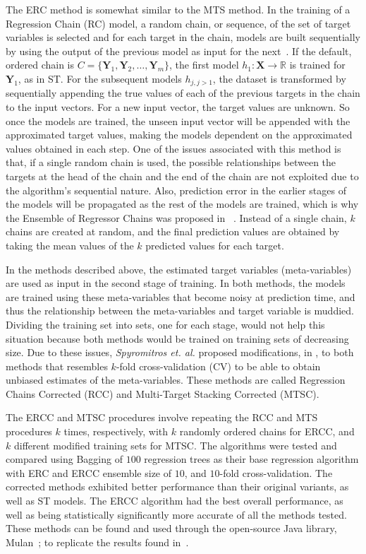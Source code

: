 \documentclass[reqno]{vcuthesis}
\numberwithin{equation}{chapter}
\begin{document}
The ERC method is somewhat similar to the MTS method. In the training of a Regression Chain (RC) model, a random chain, or sequence, of the set of target variables is selected and for each target in the chain, models are built sequentially by using the output of the previous model as input for the next~\cite{Xioufis2016}. If the default, ordered chain is $C = \{\bm Y_1, \bm Y_2, \ldots, \bm Y_m\}$, the first model $h_1 : \bm X \rightarrow \mathbb{R}$ is trained for $\bm Y_1$, as in ST. For the subsequent models $h_{j,j>1}$, the dataset is transformed by sequentially appending the true values of each of the previous targets in the chain to the input vectors. For a new input vector, the target values are unknown. So once the models are trained, the unseen input vector will be appended with the approximated target values, making the models dependent on the approximated values obtained in each step. One of the issues associated with this method is that, if a single random chain is used, the possible relationships between the targets at the head of the chain and the end of the chain are not exploited due to the algorithm's sequential nature. Also, prediction error in the earlier stages of the models will be propagated as the rest of the models are trained, which is why the Ensemble of Regressor Chains was proposed in ~\cite{Spyromitros2014}. Instead of a single chain, $k$ chains are created at random, and the final prediction values are obtained by taking the mean values of the $k$ predicted values for each target. 

In the methods described above, the estimated target variables (meta-variables) are used as input in the second stage of training. In both methods, the models are trained using these meta-variables that become noisy at prediction time, and thus the relationship between the meta-variables and target variable is muddied. Dividing the training set into sets, one for each stage, would not help this situation because both methods would be trained on training sets of decreasing size. Due to these issues, \textit{Spyromitros et. al.} proposed modifications, in \cite{Spyromitros2014}, to both methods that resembles $k$-fold cross-validation (CV) to be able to obtain unbiased estimates of the meta-variables. These methods are called Regression Chains Corrected (RCC) and Multi-Target Stacking Corrected (MTSC). 

The ERCC and MTSC procedures involve repeating the RCC and MTS procedures $k$ times, respectively, with $k$ randomly ordered chains for ERCC, and $k$ different modified training sets for MTSC. The algorithms were tested and compared using Bagging of $100$ regression trees as their base regression algorithm with ERC and ERCC ensemble size of $10$, and $10$-fold cross-validation. The corrected methods exhibited better performance than their original variants, as well as ST models. The ERCC algorithm had the best overall performance, as well as being statistically significantly more accurate of all the methods tested. These methods can be found and used through the open-source Java library, Mulan~\cite{mulan}; to replicate the results found in~\cite{Spyromitros2014}.
\end{document}
